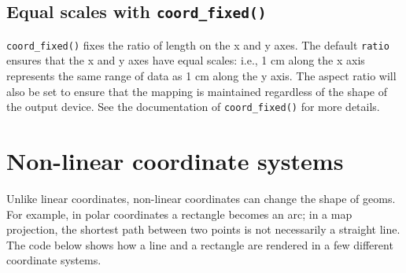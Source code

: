 \subsection{\texorpdfstring{Equal scales with
\texttt{coord\_fixed()}}{Equal scales with coord\_fixed()}}

\texttt{coord\_fixed()} fixes the ratio of length on the x and y axes.
The default \texttt{ratio} ensures that the x and y axes have equal
scales: i.e., 1 cm along the x axis represents the same range of data as
1 cm along the y axis. The aspect ratio will also be set to ensure that
the mapping is maintained regardless of the shape of the output device.
See the documentation of \texttt{coord\_fixed()} for more details.
 

\section{Non-linear coordinate systems}\label{sub:coord-non-linear}

Unlike linear coordinates, non-linear coordinates can change the shape
of geoms. For example, in polar coordinates a rectangle becomes an arc;
in a map projection, the shortest path between two points is not
necessarily a straight line. The code below shows how a line and a
rectangle are rendered in a few different coordinate systems.

\begin{Shaded}
\begin{Highlighting}[]
\StringTok{ }\NormalTok{(} \NormalTok{, } \NormalTok{)}
\StringTok{ }\NormalTok{(} \NormalTok{(}\NormalTok{, }\NormalTok{), } \NormalTok{(}\NormalTok{, }\NormalTok{))}
\StringTok{ }\NormalTok{(} \StringTok{ }
\StringTok{  }\NormalTok{(} \NormalTok{(} \NormalTok{, } \NormalTok{)) +}\StringTok{ }
\StringTok{  }\NormalTok{(} \StringTok{ }
\StringTok{  }\NormalTok{(}\NormalTok{) +}\StringTok{ }\NormalTok{(}\NormalTok{)}
\StringTok{ }\NormalTok{(}\NormalTok{)}
\StringTok{ }\NormalTok{(}\NormalTok{)}
\end{Highlighting}
\end{Shaded}

